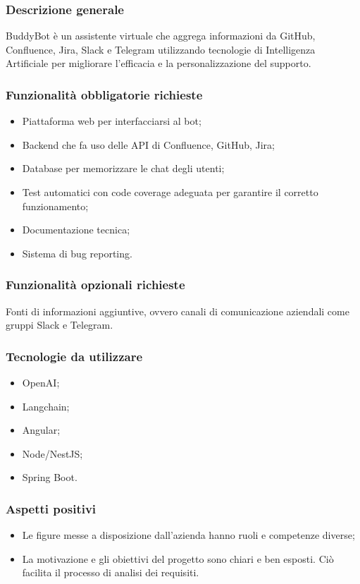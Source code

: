 \documentclass[10pt]{article}
\begin{document}
\subsubsection{Descrizione generale}
BuddyBot è un assistente virtuale che aggrega informazioni da GitHub, Confluence, Jira, Slack e Telegram utilizzando tecnologie di Intelligenza Artificiale per migliorare l'efficacia e la personalizzazione del supporto.
\subsubsection{Funzionalità obbligatorie richieste}
\begin{itemize}
    \item Piattaforma web per interfacciarsi al bot;
    \item Backend che fa uso delle API di Confluence, GitHub, Jira;
    \item Database per memorizzare le chat degli utenti;
    \item Test automatici con code coverage adeguata per garantire il corretto funzionamento;
    \item Documentazione tecnica;
    \item Sistema di bug reporting.
\end{itemize}
\subsubsection{Funzionalità opzionali richieste}
    Fonti di informazioni aggiuntive, ovvero canali di comunicazione aziendali come gruppi Slack e Telegram.
\subsubsection{Tecnologie da utilizzare}
\begin{itemize}
    \item OpenAI;
    \item Langchain;
    \item Angular;
    \item Node/NestJS;
    \item Spring Boot.
\end{itemize}
\subsubsection{Aspetti positivi}
\begin{itemize}
    \item Le figure messe a disposizione dall’azienda hanno ruoli e competenze diverse;
    \item La motivazione e gli obiettivi del progetto sono chiari e ben esposti. Ciò facilita il processo di analisi dei requisiti.
\end{itemize}
\end{document}
